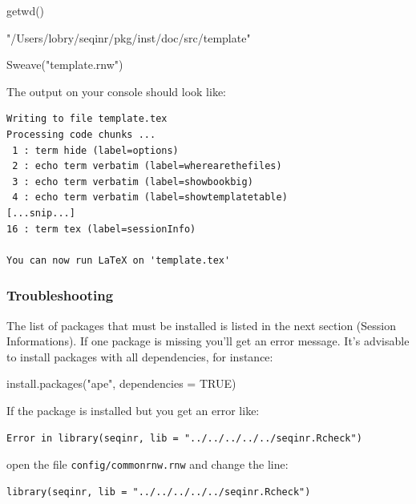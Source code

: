 \documentclass{article}
\begin{document}
\begin{Schunk}
\begin{Sinput}
 getwd()
\end{Sinput}
\begin{Soutput}
[1] "/Users/lobry/seqinr/pkg/inst/doc/src/template"
\end{Soutput}
\end{Schunk}
\begin{Schunk}
\begin{Sinput}
 Sweave("template.rnw")
\end{Sinput}
\end{Schunk}

The output on your \Rlogo{} console should look like:

\begin{verbatim}
Writing to file template.tex
Processing code chunks ...
 1 : term hide (label=options)
 2 : echo term verbatim (label=wherearethefiles)
 3 : echo term verbatim (label=showbookbig)
 4 : echo term verbatim (label=showtemplatetable)
[...snip...]
16 : term tex (label=sessionInfo)

You can now run LaTeX on 'template.tex'
\end{verbatim}

\subsubsection{Troubleshooting}

The list of \Rlogo{} packages that must be installed is listed
in the next section (Session Informations). 
If one package is missing you'll get an error message.
It's advisable to install packages with all dependencies, for instance:

\begin{Schunk}
\begin{Sinput}
 install.packages("ape", dependencies = TRUE)
\end{Sinput}
\end{Schunk}

If the \seqinr{} package is installed but you get an error like:

\begin{verbatim}
Error in library(seqinr, lib = "../../../../../seqinr.Rcheck")
\end{verbatim}

open the file \texttt{config/commonrnw.rnw} and change the line:

\begin{verbatim}
library(seqinr, lib = "../../../../../seqinr.Rcheck")
\end{verbatim}
\end{document}
